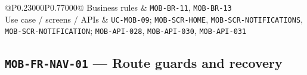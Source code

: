 \begin{longtable}{@{}P{0.23000\SRSWidth}P{0.77000\SRSWidth}@{}}
Business rules & \texttt{MOB-\allowbreak{}BR-\allowbreak{}11}, \texttt{MOB-\allowbreak{}BR-\allowbreak{}13} \\[3pt]
Use case /\allowbreak{} screens /\allowbreak{} APIs & \texttt{UC-\allowbreak{}MOB-\allowbreak{}09}; \texttt{MOB-\allowbreak{}SCR-\allowbreak{}HOME}, \texttt{MOB-\allowbreak{}SCR-\allowbreak{}NOTIFICA\allowbreak{}TIONS}, \texttt{MOB-\allowbreak{}SCR-\allowbreak{}NOTIFICA\allowbreak{}TION}; \texttt{MOB-\allowbreak{}API-\allowbreak{}028}, \texttt{MOB-\allowbreak{}API-\allowbreak{}030}, \texttt{MOB-\allowbreak{}API-\allowbreak{}031} \\[3pt]
\end{longtable}
\endgroup

\subsection{\texttt{MOB-\allowbreak{}FR-\allowbreak{}NAV-\allowbreak{}01} — Route guards and recovery}
\begingroup
\fontsize{9.5}{12}\selectfont
\setlength{\SRSWidth}{\dimexpr\linewidth-2\tabcolsep\relax}
